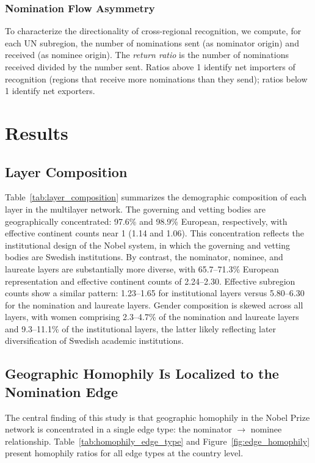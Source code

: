 \documentclass[11pt]{article}
\begin{document}
\subsubsection{Nomination Flow Asymmetry}

To characterize the directionality of cross-regional recognition, we compute, for each UN subregion, the number of nominations sent (as nominator origin) and received (as nominee origin). The \emph{return ratio} is the number of nominations received divided by the number sent. Ratios above 1 identify net importers of recognition (regions that receive more nominations than they send); ratios below 1 identify net exporters.

\section{Results}
\label{sec:results}

\subsection{Layer Composition}

Table~\ref{tab:layer_composition} summarizes the demographic composition of each layer in the multilayer network. The governing and vetting bodies are geographically concentrated: 97.6\% and 98.9\% European, respectively, with effective continent counts near 1 (1.14 and 1.06). This concentration reflects the institutional design of the Nobel system, in which the governing and vetting bodies are Swedish institutions. By contrast, the nominator, nominee, and laureate layers are substantially more diverse, with 65.7--71.3\% European representation and effective continent counts of 2.24--2.30. Effective subregion counts show a similar pattern: 1.23--1.65 for institutional layers versus 5.80--6.30 for the nomination and laureate layers. Gender composition is skewed across all layers, with women comprising 2.3--4.7\% of the nomination and laureate layers and 9.3--11.1\% of the institutional layers, the latter likely reflecting later diversification of Swedish academic institutions.



\subsection{Geographic Homophily Is Localized to the Nomination Edge}

The central finding of this study is that geographic homophily in the Nobel Prize network is concentrated in a single edge type: the nominator $\to$ nominee relationship. Table~\ref{tab:homophily_edge_type} and Figure~\ref{fig:edge_homophily} present homophily ratios for all edge types at the country level.
\end{document}

